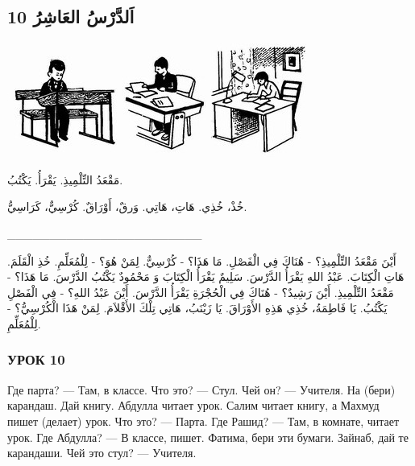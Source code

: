 \documentclass[a5paper]{article}
\begin{document}
\subsection{10 اَلدَّرْسُ العَاشِرُ}
 \includegraphics[width=1.4374in,height=1.4791in]{images/MuhammadBagauddinprettified-img014.jpg}   \includegraphics[width=1.0937in,height=1.4689in]{images/MuhammadBagauddinprettified-img015.jpg}   \includegraphics[width=1.2398in,height=1.4689in]{images/MuhammadBagauddinprettified-img016.jpg} 

مَقْعَدُ التِّلْمِيذِ. يَقْرَأُ. يَكْتُبُ.

خُذْ، خُذِي. هَاتِ، هَاتِي. وَرقٌ، أَوْرَاقٌ. كُرْسِيٌّ، كَرَاسِيُّ.

\_\_\_\_\_\_\_\_\_\_\_\_\_\_\_\_\_\_\_\_\_\_\_ 

أَيْنَ مَقْعَدُ التِّلْمِيذِ؟ - هُنَاكَ فِي الْفَصْلِ. مَا هَذَا؟ - كُرْسِيٌّ. لِمَنْ هُوَ؟ - لِلْمُعَلِّمِ. خُذِ الْقَلَمَ. هَاتِ الْكِتَابَ. عَبْدُ اللهِ يَقْرَأُ الدَّرْسَ. سَلِيمٌ يَقْرَأُ الْكِتَابَ وَ مَحْمُودٌ يَكْتُبُ الدَّرْسَ. مَا هَذَا؟ - مَقْعَدُ التِّلْمِيذِ. أَيْنَ رَشِيدٌ؟ - هُنَاكَ فِي الْحُجْرَةِ يَقْرَأُ الدَّرْسَ. أَيْنَ عَبْدُ اللهِ؟ - فِي الْفَصْلِ يَكْتُبُ. يَا فَاطِمَةُ، خُذِي هَذِهِ الأَوْرَاقَ. يَا زَيْنَبُ، هَاتِي تِلْكَ الأَقْلاَمَ. لِمَنْ هَذَا الْكُرْسِيُّ؟ - لِلْمُعَلِّمِ.

\subsubsection{УРОК 10}
Где парта? — Там, в классе. Что это? — Стул. Чей он? — Учителя. На (бери) карандаш. Дай книгу. Абдулла читает урок. Салим читает книгу, а Махмуд пишет (делает) урок. Что это? — Парта. Где Рашид? — Там, в комнате, читает урок. Где Абдулла? — В классе, пишет. Фатима, бери эти бумаги. Зайнаб, дай те карандаши. Чей это стул? — Учителя.
\end{document}
